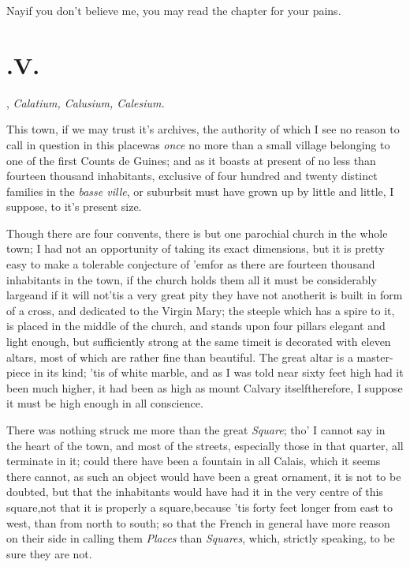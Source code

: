 \documentclass{article}
\begin{document}
\tsk Nay\tsk if you don’t believe me, you may read the
chapter for your pains.

\section{.\enspace V.}

, \textit{Calatium, Calusium,\break
Calesium.}

This town, if we may trust it's archives, the authority of which
I see no reason to call in question in this place\tsk was
\textit{once} no more than a small village belonging to one of the
first Counts de Guines; and as it boasts at present of no
less than fourteen thousand inhabitants, exclusive of four hundred
and twenty distinct families in the \textit{basse ville}, or
suburbs\tsh it must have grown up by little and little, I
suppose, to it's present size.

Though there are four convents, there is but one parochial church in the whole town;
I had not an opportunity of taking its exact dimensions, but it is pretty easy to
make a tolerable conjecture of ’em\tsk\break for as there are fourteen thousand
inhabitants in the town, if the church holds them all it must be considerably
large\tsk and if it will not\tsk ’tis a very great pity they have not another\tsk it
is built in form of a cross, and dedicated to the Virgin Mary; the steeple which
has a spire to it, is placed in the middle of the church, and stands upon four
pillars elegant and light enough, but sufficiently strong at the same time\tsk it is
decorated with eleven altars, most of which are rather fine than beautiful. The
great altar is a master-piece in its kind; ’tis of white marble, and as I was
told near sixty feet high\tsk{} had it been much higher, it had been as high as
mount Calvary itself\tsk therefore, I suppose it must be high enough in all
conscience.

There was nothing struck me more than the great \textit{Square};
tho’ I cannot say\break
{}\break in the heart of the town, and most of the streets,
especially those in that quarter, all terminate in it; could there
have been a fountain in all Calais, which it seems there
cannot, as such an object would have been a great ornament, it is
not to be doubted, but that the inhabitants would have had it in
the very centre of this square,\tsk not that it is properly a
square,\break\tsk because ’tis forty feet longer from
east to west, than from north to south; so that the French
in general have more reason on their side in calling them
\textit{Places} than \textit{Squares}, which, strictly speaking, to be
sure they are not.
\end{document}

